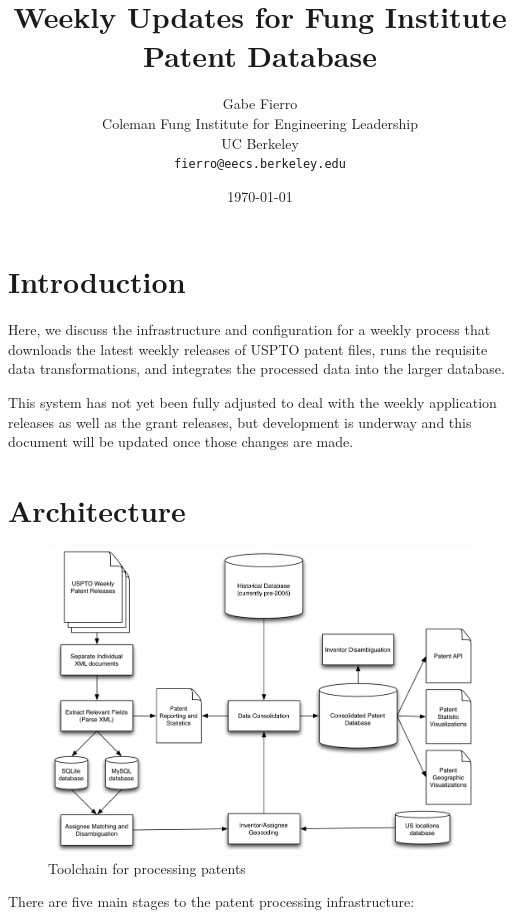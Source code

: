 \documentclass[11pt]{article}
\begin{document}
\title{Weekly Updates for Fung Institute Patent Database}
\author{Gabe Fierro\\
	Coleman Fung Institute for Engineering Leadership\\
	UC Berkeley\\
	\texttt{fierro@eecs.berkeley.edu}}
\date{\today}
\maketitle

\section{Introduction}

Here, we discuss the infrastructure and configuration for a weekly process that
downloads the latest weekly releases of USPTO patent files, runs the requisite
data transformations, and integrates the processed data into the larger
database.

This system has not yet been fully adjusted to deal with the weekly application
releases as well as the grant releases, but development is underway and this
document will be updated once those changes are made.

\section{Architecture}

\begin{figure}[h]
\center
\includegraphics[width=.8\textwidth]{figs/dataprocess}
\caption{Toolchain for processing patents}
\label{fig:dataprocess}
\end{figure}

There are five main stages to the patent processing infrastructure:
\end{document}
